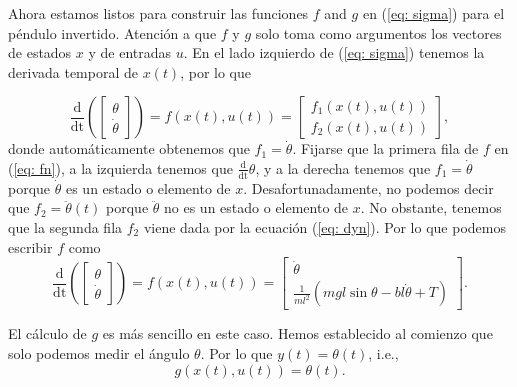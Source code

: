 Ahora estamos listos para construir las funciones $f$ and $g$ en (\ref{eq: sigma}) para el péndulo invertido. Atención a que $f$ y $g$ solo toma como argumentos los vectores de estados $x$ y de entradas $u$. En el lado izquierdo de (\ref{eq: sigma}) tenemos la derivada temporal de $x(t)$, por lo que

\begin{equation}
	\frac{\mathrm{d}}{\mathrm{dt}}\left(\begin{bmatrix}\theta \\ \dot\theta \end{bmatrix}\right) = f(x(t), u(t)) = \begin{bmatrix}f_1(x(t), u(t)) \\ f_2(x(t), u(t))\end{bmatrix}, \label{eq: fn}
\end{equation}
donde automáticamente obtenemos que $f_1 = \dot\theta$. Fijarse que la primera fila de $f$ en (\ref{eq: fn}), a la izquierda tenemos que $\frac{\mathrm{d}}{\mathrm{dt}}\theta$, y a la derecha tenemos que $f_1 = \dot\theta$ porque $\dot\theta$ es un estado o elemento de $x$. Desafortunadamente, no podemos decir que $f_2 = \ddot\theta(t)$ porque $ \ddot\theta$ no es un estado o elemento de $x$. No obstante, tenemos que la segunda fila $f_2$ viene dada por la ecuación (\ref{eq: dyn}). Por lo que podemos escribir $f$ como
\begin{equation}
	\frac{\mathrm{d}}{\mathrm{dt}}\left(\begin{bmatrix}\theta \\ \dot\theta \end{bmatrix}\right) =  f(x(t), u(t)) = \begin{bmatrix} \dot\theta \\ \frac{1}{ml^2}\left(mgl\sin{\theta}-bl\dot\theta + T\right) \end{bmatrix}. \label{eq: f}
\end{equation}

El cálculo de $g$ es más sencillo en este caso. Hemos establecido al comienzo que solo podemos medir el ángulo $\theta$. Por lo que $y(t) = \theta(t)$, i.e.,
\begin{equation}
g(x(t),u(t)) =  \theta(t).
	\label{eq: g}
\end{equation}


